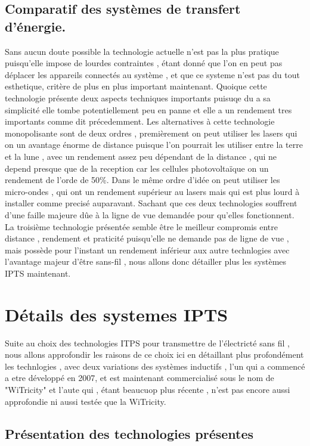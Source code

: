 \documentclass[12pt]{report}
\begin{document}
\section{Comparatif des systèmes de transfert d'énergie.}
	Sans aucun doute possible la technologie actuelle n'est pas la plus pratique puisqu'elle impose de lourdes contraintes , étant donné que l'on en peut pas déplacer les appareils connectés au système , et que ce systeme n'est pas du tout esthetique, critère de plus en plus important maintenant. Quoique cette technologie présente deux aspects techniques importants puisuqe du a sa simplicité elle tombe potentiellement peu en panne et elle a un rendement tres importants comme dit précedemment. Les alternatives à cette technologie monopolisante sont de deux ordres , premièrement on peut utiliser les lasers qui on un avantage énorme de distance puisque l'on pourrait les utiliser entre la terre et la lune , avec un rendement assez peu dépendant de la distance , qui ne depend presque que de la reception car les cellules photovoltaïque on un rendement de l'orde de 50\%. Dans le même ordre d'idée on peut utiliser les micro-ondes , qui ont un rendement supérieur au lasers mais qui est plus lourd à installer comme precisé auparavant. Sachant que ces deux technologies souffrent d'une faille majeure dûe à la ligne de vue demandée pour qu'elles fonctionnent. La troisième technologie présentée semble être le meilleur compromis entre distance , rendement et praticité puisqu'elle ne demande pas de ligne de vue , mais possède pour l'instant un rendement inférieur aux autre technlogies avec l'avantage majeur d'être sans-fil , nous allons donc détailler plus les systèmes IPTS maintenant.

\chapter{Détails des systemes IPTS}
  Suite au choix des technologies ITPS pour transmettre de l'électricté sans fil , nous allons approfondir les raisons de ce choix ici en détaillant plus profondément les technlogies , avec deux variations des systèmes inductifs , l'un qui a commencé a etre développé en 2007, et est maintenant commercialisé sous le nom de "WiTricity" et l'aute qui , étant beaucuop plus récente , n'est pas encore aussi approfondie ni aussi testée que la WiTricity.
\section{Présentation des technologies présentes}
\end{document}
